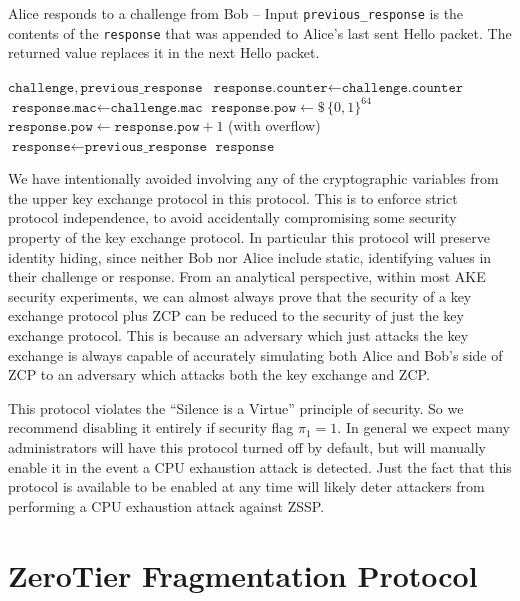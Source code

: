 \documentclass{article}
\begin{document}
\begin{algorithm}
	\caption{Alice responds to a challenge from Bob -- Input \texttt{previous\_response} is the contents of the \texttt{response} that was appended to Alice's last sent Hello packet. The returned value replaces it in the next Hello packet.}\label{alg:challenge_response}
	\begin{algorithmic}
		\Require $\texttt{challenge},\, \texttt{previous\_response}$
			\State $\texttt{response.counter} \gets \texttt{challenge.counter}$
			\State $\texttt{response.mac} \gets \texttt{challenge.mac}$
			\State $\texttt{response.pow} \gets\$\,\{0,1\}^{64}$
			\State $\texttt{response}\texttt{.pow} \gets \texttt{response}\texttt{.pow} + 1$ (with overflow)
			\EndWhile
		\Else
			\State $\texttt{response} \gets \texttt{previous\_response}$
		\EndIf
		\Ensure $\texttt{response}$
	\end{algorithmic}
\end{algorithm}

We have intentionally avoided involving any of the cryptographic variables from the upper key exchange protocol in this protocol. This is to enforce strict protocol independence, to avoid accidentally compromising some security property of the key exchange protocol. In particular this protocol will preserve identity hiding, since neither Bob nor Alice include static, identifying values in their challenge or response. From an analytical perspective, within most AKE security experiments, we can almost always prove that the security of a key exchange protocol plus ZCP can be reduced to the security of just the key exchange protocol. This is because an adversary which just attacks the key exchange is always capable of accurately simulating both Alice and Bob's side of ZCP to an adversary which attacks both the key exchange and ZCP.

This protocol violates the ``Silence is a Virtue'' principle of security. So we recommend disabling it entirely if security flag $\pi_1=1$. In general we expect many administrators will have this protocol turned off by default, but will manually enable it in the event a CPU exhaustion attack is detected. Just the fact that this protocol is available to be enabled at any time will likely deter attackers from performing a CPU exhaustion attack against ZSSP.

\section{ZeroTier Fragmentation Protocol}
\end{document}
